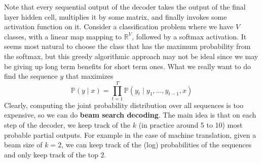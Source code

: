 \documentclass{article}
\begin{document}
      Note that every sequential output of the decoder takes the output of the final layer hidden cell, multiplies it by some matrix, and finally invokes some activation function on it. Consider a classification problem where we have $V$ classes, with a linear map mapping to $\mathbb{R}^{V}$, followed by a softmax activation. It seems most natural to choose the class that has the maximum probability from the softmax, but this greedy algorithmic approach may not be ideal since we may be giving up long term benefits for short term ones. What we really want to do find the sequence $y$ that maximizes 
      \[\mathbb{P}(y \mid x) = \prod_{t=1}^T \mathbb{P}( y_t \mid y_{1}, \ldots, y_{t-1}, x)\]
      Clearly, computing the joint probability distribution over all sequences is too expensive, so we can do \textbf{beam search decoding}. The main idea is that on each step of the decoder, we keep track of the $k$ (in practice around 5 to 10) most probable partial outputs. For example in the case of machine translation, given a beam size of $k = 2$, we can keep track of the (log) probabilities of the sequences and only keep track of the top $2$. 
\end{document}
